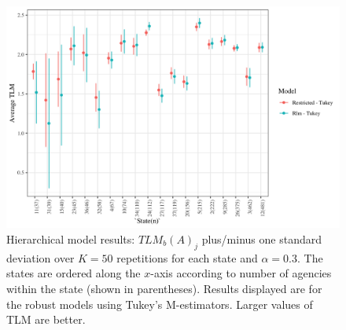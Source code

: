 \documentclass[ba]{imsart}
\begin{document}
 
\begin{figure}[t]
\centering
\includegraphics[width=6.8in]{hier_ave_tlm_state.png}
\caption{Hierarchical model results: ${TLM}_b(A)_{j}$  plus/minus one standard deviation over $K = 50$ repetitions for each state and $\alpha = 0.3$. The states are ordered along the $x$-axis according to number of agencies within the state (shown in parentheses). Results displayed are for the robust models using Tukey's M-estimators. Larger values of TLM are better.}
\label{fig:hierTLMstate}
\end{figure}




\end{document}
